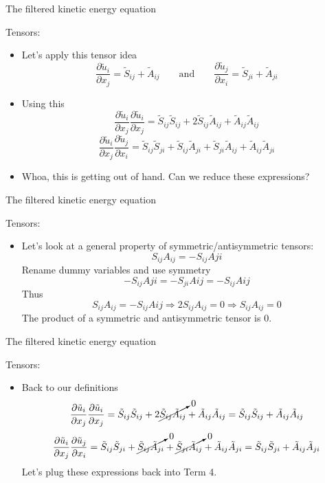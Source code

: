 \begin{frame}{The filtered kinetic energy equation}

Tensors:
\begin{itemize}
	\item Let's apply this tensor idea
	$$\frac{\partial \tilde u_i}{\partial x_j} = \tilde S_{ij} + \tilde A_{ij} \qquad \text{and} \qquad \frac{\partial \tilde u_j}{\partial x_i} = \tilde S_{ji} + \tilde A_{ji}$$
	\item Using this
	$$\frac{\partial \tilde u_i}{\partial x_j}\frac{\partial \tilde u_i}{\partial x_j} =  \tilde S_{ij}\tilde S_{ij} + 2\tilde S_{ij}\tilde A_{ij} + \tilde A_{ij}\tilde A_{ij}$$
	$$\frac{\partial \tilde u_i}{\partial x_j}\frac{\partial \tilde u_j}{\partial x_i} = \tilde S_{ij}\tilde S_{ji} + \tilde S_{ij} \tilde A_{ji} + \tilde S_{ji} \tilde A_{ij} + \tilde A_{ij}\tilde A_{ji}$$
	\item Whoa, this is getting out of hand. Can we reduce these expressions?
\end{itemize}
\end{frame}


\begin{frame}{The filtered kinetic energy equation}

Tensors:
\begin{itemize}
	\item Let's look at a general property of symmetric/antisymmetric tensors:
	$$S_{ij}A_{ij} = -S_{ij}A{ji}$$
	Rename dummy variables and use symmetry
	$$-S_{ij}A{ji} = -S_{ji}A{ij} = -S_{ij}A{ij}$$
	Thus
	$$S_{ij}A_{ij} = -S_{ij}A{ij} \Rightarrow 2S_{ij}A_{ij}=0\Rightarrow S_{ij}A_{ij} = 0$$
	The product of a symmetric and antisymmetric tensor is 0.
\end{itemize}
\end{frame}


\begin{frame}{The filtered kinetic energy equation}

Tensors:
\begin{itemize}
	\item Back to our definitions
	$$\frac{\partial \tilde u_i}{\partial x_j}\frac{\partial \tilde u_i}{\partial x_j} =  \tilde S_{ij}\tilde S_{ij} + 2\cancelto{0}{\tilde S_{ij}\tilde A_{ij}} + \tilde A_{ij}\tilde A_{ij} = \tilde S_{ij}\tilde S_{ij} + \tilde A_{ij}\tilde A_{ij}$$
	$$\frac{\partial \tilde u_i}{\partial x_j}\frac{\partial \tilde u_j}{\partial x_i} = \tilde S_{ij}\tilde S_{ji} + \cancelto{0}{\tilde S_{ij} \tilde A_{ji}} + \cancelto{0}{\tilde S_{ji} \tilde A_{ij}} + \tilde A_{ij}\tilde A_{ji} = \tilde S_{ij}\tilde S_{ji} + \tilde A_{ij}\tilde A_{ji}$$
	Let's plug these expressions back into Term 4.
\end{itemize}
\end{frame}

